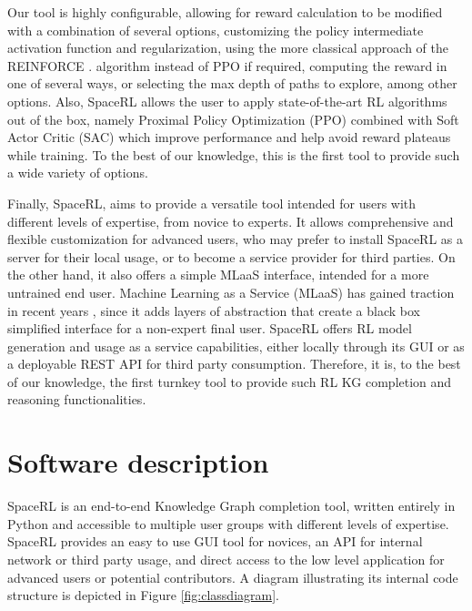 Our tool is highly configurable, allowing for reward calculation to be modified with a combination of several options, customizing the policy intermediate activation function and regularization, using the more classical approach of the REINFORCE .
algorithm instead of PPO if required, computing the reward in one of several ways, or selecting the max depth of paths to explore, among other options. Also, SpaceRL allows the user to apply state-of-the-art RL algorithms out of the box, namely Proximal Policy Optimization (PPO)
combined with Soft Actor Critic (SAC)
which improve performance and help avoid reward plateaus while training. To the best of our knowledge, this is the first tool to provide such a wide variety of options.

Finally, SpaceRL, aims to provide a versatile tool intended for users with different levels of expertise, from novice to experts. It allows comprehensive and flexible customization for advanced users, who may prefer to install SpaceRL as a server for their local usage, or to become a service provider for third parties. On the other hand, it also offers a simple MLaaS interface, intended for a more untrained end user. Machine Learning as a Service (MLaaS) has gained traction in recent years 
, since it adds layers of abstraction that create a black box simplified interface for a non-expert final user. SpaceRL offers RL model generation and usage as a service capabilities, either locally through its GUI or as a deployable REST API for third party consumption. Therefore, it is, to the best of our knowledge, the first turnkey tool to provide such RL KG completion and reasoning functionalities.

\section{Software description}\label{sec:framework-software}
SpaceRL is an end-to-end Knowledge Graph completion tool, written entirely in Python and accessible to multiple user groups with different levels of expertise. SpaceRL provides an easy to use GUI tool for novices, an API for internal network or third party usage, and direct access to the low level application for advanced users or potential contributors. A diagram illustrating its internal code structure is depicted in Figure \ref{fig:classdiagram}.



